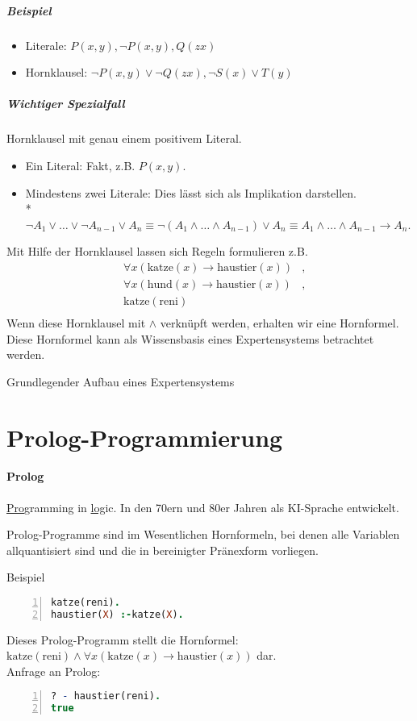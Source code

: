 \documentclass[a4paper]{scrartcl}
\begin{document}
\subparagraph{Beispiel}
\begin{itemize}
\item Literale: $P(x,y), \neg P(x,y), Q(zx)$\\
\item Hornklausel: $\neg P(x,y) \vee \neg Q(zx), \neg S(x) \vee T(y)$
\end{itemize}

\subparagraph{Wichtiger Spezialfall} Hornklausel mit genau einem positivem Literal.
\begin{itemize}
\item Ein Literal: Fakt, z.B. $P(x,y)$.
\item Mindestens zwei Literale: Dies lässt sich als Implikation darstellen.\\*
$ \neg A_1 \vee \dots \vee \neg A_{n-1} \vee A_n \equiv \neg (A_1 \wedge \dots \wedge A_{n-1} ) \vee A_n \equiv A_1 \wedge \dots \wedge A_{n-1} \rightarrow A_n$.
\end{itemize}

Mit Hilfe der Hornklausel lassen sich Regeln formulieren z.B.
\begin{align*}
&\forall x (\text{katze} (x) \rightarrow \text{haustier} (x)) &,\\
&\forall x (\text{hund} (x) \rightarrow \text{haustier} (x))&,\\
&\text{katze}(\text{reni})\\
\end{align*}
Wenn diese Hornklausel mit $\wedge$ verknüpft werden, erhalten wir eine Hornformel. Diese Hornformel kann als Wissensbasis eines Expertensystems betrachtet werden.

Grundlegender Aufbau eines Expertensystems

\section{Prolog-Programmierung}
\paragraph{Prolog} \underline{Pro}gramming in \underline{log}ic. In den 70ern und 80er Jahren als KI-Sprache entwickelt.

Prolog-Programme sind im Wesentlichen Hornformeln, bei denen alle Variablen allquantisiert sind und die in bereinigter Pränexform vorliegen.

Beispiel 
\begin{lstlisting}[numbers=left, tabsize=4, language=Prolog]
katze(reni).
haustier(X) :-katze(X).
\end{lstlisting}
Dieses Prolog-Programm stellt die Hornformel:
$\text{katze}(\text{reni}) \wedge \forall x(\text{katze}(x) \rightarrow \text{haustier}(x))$ dar.\\
Anfrage an Prolog:
\begin{lstlisting}[numbers=left, tabsize=4, language=Prolog]
? - haustier(reni).
true
\end{lstlisting}
\end{document}
